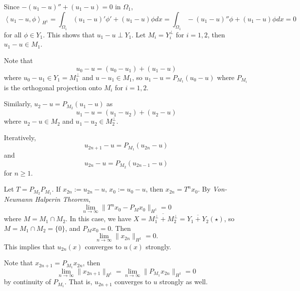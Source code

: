 \documentclass[11pt, a4paper]{amsart}
\begin{document}
Since $-(u_1-u)''+(u_1-u)=0 \mbox{ in } \Omega_1$,$$\left\langle u_1-u,\phi\right\rangle_{H^1}=\int_{\Omega_1}(u_1-u)'\phi'+(u_1-u)\phi dx=\int_{\Omega_1}-(u_1-u)''\phi+(u_1-u)\phi dx=0$$ for all $\phi\in Y_1.$ This shows that $u_1-u\perp Y_1$. Let $M_i=Y_{i}^{\perp}$ for $i=1,2$, then $u_1-u\in M_1$. 

Note that $$u_0-u=(u_0-u_1)+(u_1-u)$$ where $u_0-u_1\in Y_1=M_{1}^{\perp}$ and $u-u_1\in M_1$, so $u_1-u=P_{M_1}(u_0-u)$ where $P_{M_i}$ is the orthogonal projection onto $M_i$ for $i=1,2$. 

Similarly, $u_2-u=P_{M_2}(u_1-u)$ as $$u_1-u=(u_1-u_2)+(u_2-u)$$ where $u_2-u\in M_2$ and $u_1-u_2\in M_{2}^{\perp}$.

Iteratively, $$u_{2n+1}-u=P_{M_1}(u_{2n}-u)$$ and $$u_{2n}-u=P_{M_2}(u_{2n-1}-u)$$ for $n\geq 1$.

Let $T=P_{M_2}P_{M_1}$. If $x_{2n}:=u_{2n}-u$, $x_0:=u_0-u$, then $x_{2n}=T^n x_0$.
By \emph{Von-Neumann Halperin Theorem}, $$\lim_{n\rightarrow \infty}\|T^n x_0-P_{M}x_0\|_{H^1}=0$$ where $M=M_1\cap M_2$. In this case, we have $X=\overline{M_{1}^{\perp}+M_{2}^{\perp}}=\overline{Y_1+Y_2}(\star)$, so $M=M_1\cap M_2=\{0\}$, and $P_{M}x_0=0$. Then $$\lim_{n\rightarrow \infty} \|x_{2n}\|_{H^1}=0.$$ This implies that $u_{2n}(x)$ converges to $u(x)$ strongly.

Note that $x_{2n+1}=P_{M_1}x_{2n}$, then
$$\lim_{n\rightarrow \infty}\|x_{2n+1}\|_{H^1}=\lim_{n\rightarrow \infty} \|P_{M_1}x_{2n}\|_{H^1}=0$$ by continuity of $P_{M_1}$. That is, $u_{2n+1}$ converges to $u$ strongly as well.
\end{document}
